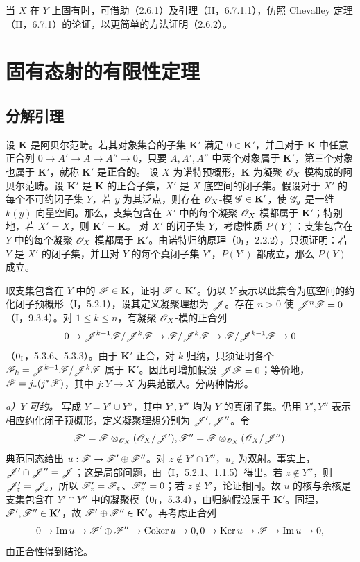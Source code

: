 当 $X$ 在 $Y$ 上固有时，可借助（2.6.1）及引理（II，6.7.1.1），仿照 Chevalley 定理（II，6.7.1）的论证，以更简单的方法证明（2.6.2）。\par

\section{固有态射的有限性定理}
\subsection{分解引理}
设 $\mathbf K$ 是阿贝尔范畴。若其对象集合的子集 $\mathbf K'$ 满足 $0\in\mathbf K'$，并且对于 $\mathbf K$ 中任意正合列 $0\to A'\to A\to A''\to0$，只要 $A,A',A''$ 中两个对象属于 $\mathbf K'$，第三个对象也属于 $\mathbf K'$，就称 $\mathbf K'$ 是\textbf{正合的}。
设 $X$ 为诺特预概形，$\mathbf K$ 为凝聚 $\mathscr O_X$-模构成的阿贝尔范畴。设 $\mathbf K'$ 是 $\mathbf K$ 的正合子集，$X'$ 是 $X$ 底空间的闭子集。假设对于 $X'$ 的每个不可约闭子集 $Y$，若 $y$ 为其泛点，则存在 $\mathscr O_X$-模 $\mathscr G\in\mathbf K'$，使 $\mathscr G_y$ 是一维 $k(y)$-向量空间。那么，支集包含在 $X'$ 中的每个凝聚 $\mathscr O_X$-模都属于 $\mathbf K'$；特别地，若 $X'=X$，则 $\mathbf K'=\mathbf K$。
\eproof
对 $X'$ 的闭子集 $Y$，考虑性质 $P(Y)$：支集包含在 $Y$ 中的每个凝聚 $\mathscr O_X$-模都属于 $\mathbf K'$。由诺特归纳原理（$0_{\mathrm I}$，2.2.2），只须证明：若 $Y$ 是 $X'$ 的闭子集，并且对 $Y$ 的每个真闭子集 $Y'$，$P(Y')$ 都成立，那么 $P(Y)$ 成立。

取支集包含在 $Y$ 中的 $\mathscr F\in\mathbf K$，证明 $\mathscr F\in\mathbf K'$。仍以 $Y$ 表示以此集合为底空间的约化闭子预概形（I，5.2.1），设其定义凝聚理想为 $\mathscr J$。存在 $n>0$ 使 $\mathscr J^n\mathscr F=0$（I，9.3.4）。对 $1\le k\le n$，有凝聚 $\mathscr O_X$-模的正合列
\[
0\to\mathscr J^{k-1}\mathscr F/\mathscr J^k\mathscr F\to\mathscr F/\mathscr J^k\mathscr F\to\mathscr F/\mathscr J^{k-1}\mathscr F\to0
\]
（$0_{\mathrm I}$，5.3.6、5.3.3）。由于 $\mathbf K'$ 正合，对 $k$ 归纳，只须证明各个 $\mathscr F_k=\mathscr J^{k-1}\mathscr F/\mathscr J^k\mathscr F$ 属于 $\mathbf K'$。因此可增加假设 $\mathscr J\mathscr F=0$；等价地，$\mathscr F=j_*(j^*\mathscr F)$，其中 $j:Y\to X$ 为典范嵌入。分两种情形。

\textit{a）$Y$ 可约。} 写成 $Y=Y'\cup Y''$，其中 $Y',Y''$ 均为 $Y$ 的真闭子集。仍用 $Y',Y''$ 表示相应约化闭子预概形，定义凝聚理想分别为 $\mathscr J',\mathscr J''$。令
\[
\mathscr F'=\mathscr F\otimes_{\mathscr O_X}(\mathscr O_X/\mathscr J'),
\mathscr F''=\mathscr F\otimes_{\mathscr O_X}(\mathscr O_X/\mathscr J'').
\]
典范同态给出 $u:\mathscr F\to\mathscr F'\oplus\mathscr F''$。对 $z\notin Y'\cap Y''$，$u_z$ 为双射。事实上，$\mathscr J'\cap\mathscr J''=\mathscr J$；这是局部问题，由（I，5.2.1、1.1.5）得出。若 $z\notin Y''$，则 $\mathscr J'_z=\mathscr J_z$，所以 $\mathscr F'_z=\mathscr F_z$、$\mathscr F''_z=0$；若 $z\notin Y'$，论证相同。故 $u$ 的核与余核是支集包含在 $Y'\cap Y''$ 中的凝聚模（$0_{\mathrm I}$，5.3.4），由归纳假设属于 $\mathbf K'$。同理，$\mathscr F',\mathscr F''\in\mathbf K'$，故 $\mathscr F'\oplus\mathscr F''\in\mathbf K'$。再考虑正合列
\[
0\to\operatorname{Im} u\to\mathscr F'\oplus\mathscr F''\to\operatorname{Coker} u\to0,
 0\to\operatorname{Ker} u\to\mathscr F\to\operatorname{Im} u\to0,
\]
由正合性得到结论。

